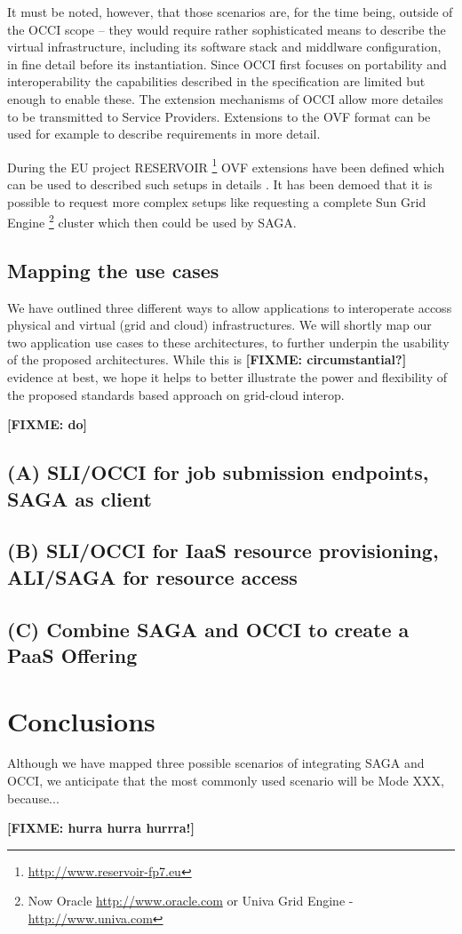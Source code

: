 \documentclass[10pt,conference,final,letterpaper,twoside,twocolumn,]{IEEEtran}
\newcommand{\B}[1]{\textbf{#1}}
\newcommand{\F}[1]{\B{[FIXME: #1]}}
\begin{document}
It must be noted, however, that those scenarios are, for the time
being, outside of the OCCI scope -- they would require rather
sophisticated means to describe the virtual infrastructure, including
its software stack and middlware configuration, in fine detail before
its instantiation. Since OCCI first focuses on portability and
interoperability the capabilities described in the specification are
limited but enough to enable these. The extension mechanisms of OCCI
allow more detailes to be transmitted to Service Providers. Extensions
to the OVF format can be used for example to describe requirements in
more detail.

During the EU project
RESERVOIR \footnote{\url{http://www.reservoir-fp7.eu}} OVF extensions
have been defined which can be used to described such setups in
details \cite{comsware09}. It has been demoed that it is possible to
request more complex setups like requesting a complete Sun Grid
Engine \footnote{Now Oracle \url{http://www.oracle.com} or Univa Grid
  Engine - \url{http://www.univa.com}} cluster which then could be
used by SAGA.

 \subsection{Mapping the use cases}

 We have outlined three different ways to allow applications to
 interoperate accoss physical and virtual (grid and cloud)
 infrastructures.  We will shortly map our two application use cases
 to these architectures, to further underpin the usability of the
 proposed architectures.  While this is \F{circumstantial?} evidence
 at best, we hope it helps to better illustrate the power and
 flexibility of the proposed standards based approach on grid-cloud
 interop.

 \F{do}
 \subsection{(A) SLI/OCCI for job submission endpoints, SAGA as client}
 \subsection{(B) SLI/OCCI for IaaS resource provisioning, ALI/SAGA for
 resource access} 
 \subsection{(C) Combine SAGA and OCCI to create a PaaS Offering}


\section{Conclusions}

Although we have mapped three possible scenarios of integrating SAGA
and OCCI, we anticipate that the most commonly used scenario will be
Mode XXX, because...


\label{sec:conc}

 \F{hurra hurra hurrra!}




\end{document}
